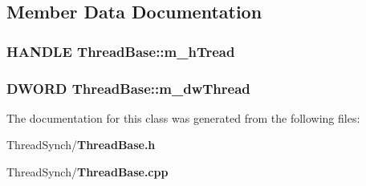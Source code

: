 \subsection{Member Data Documentation}
\subsubsection{\setlength{\rightskip}{0pt plus 5cm}HANDLE {\bf Thread\-Base::m\_\-h\-Tread}\hspace{0.3cm}{\tt  [private]}}\label{class_thread_base_6043149387a23497ab5121460f58ba25}


\subsubsection{\setlength{\rightskip}{0pt plus 5cm}DWORD {\bf Thread\-Base::m\_\-dw\-Thread}\hspace{0.3cm}{\tt  [private]}}\label{class_thread_base_d60930f9341746e60b77fc25d59a4b0d}




The documentation for this class was generated from the following files:\begin{CompactItemize}
\item 
Thread\-Synch/{\bf Thread\-Base.h}\item 
Thread\-Synch/{\bf Thread\-Base.cpp}\end{CompactItemize}
